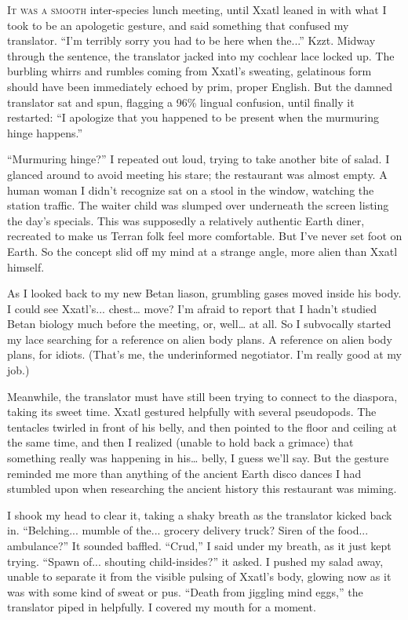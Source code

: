 
\lettrine{I}{t was a smooth} inter-species lunch meeting, until Xxatl leaned in with
what I took to be an apologetic gesture, and said something that
confused my translator. ``I'm terribly sorry you had to be here when
the...'' Kzzt. Midway through the sentence, the translator jacked into
my cochlear lace locked up. The burbling whirrs and rumbles coming from
Xxatl's sweating, gelatinous form should have been immediately echoed by
prim, proper English. But the damned translator sat and spun, flagging a
96\% lingual confusion, until finally it restarted: ``I apologize that
you happened to be present when the murmuring hinge happens.''

``Murmuring hinge?'' I repeated out loud, trying to take another bite of
salad. I glanced around to avoid meeting his stare; the restaurant was
almost empty. A human woman I didn't recognize sat on a stool in the
window, watching the station traffic. The waiter child was slumped over
underneath the screen listing the day's specials. This was supposedly a
relatively authentic Earth diner, recreated to make us Terran folk feel
more comfortable. But I've never set foot on Earth. So the concept slid
off my mind at a strange angle, more alien than Xxatl himself.

As I looked back to my new Betan liason, grumbling gases moved inside
his body. I could see Xxatl's... chest\ldots{} move? I'm afraid to
report that I hadn't studied Betan biology much before the meeting, or,
well\ldots{} at all. So I subvocally started my lace searching for a
reference on alien body plans. A reference on alien body plans, for
idiots. (That's me, the underinformed negotiator. I'm really good at my
job.)

Meanwhile, the translator must have still been trying to connect to the
diaspora, taking its sweet time. Xxatl gestured helpfully with several
pseudopods. The tentacles twirled in front of his belly, and then
pointed to the floor and ceiling at the same time, and then I realized
(unable to hold back a grimace) that something really was happening in
his\ldots{} belly, I guess we'll say. But the gesture reminded me more
than anything of the ancient Earth disco dances I had stumbled upon when
researching the ancient history this restaurant was miming.

I shook my head to clear it, taking a shaky breath as the translator
kicked back in. ``Belching... mumble of the... grocery delivery truck?
Siren of the food... ambulance?'' It sounded baffled. ``Crud,'' I said
under my breath, as it just kept trying. ``Spawn of... shouting
child-insides?'' it asked. I pushed my salad away, unable to separate it
from the visible pulsing of Xxatl's body, glowing now as it was with
some kind of sweat or pus. ``Death from jiggling mind eggs,'' the
translator piped in helpfully. I covered my mouth for a moment.

